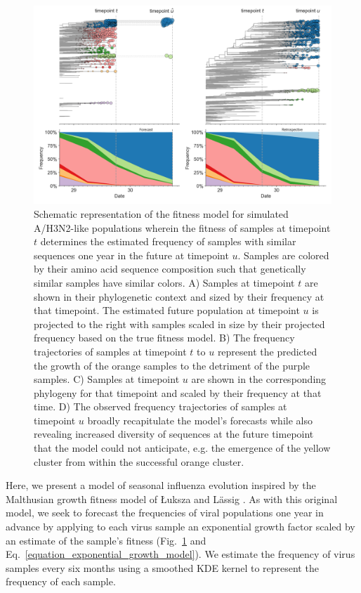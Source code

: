 \begin{figure}[ht]
  \begin{center}
  \includegraphics[width=\columnwidth]{figures/distance-based-fitness-model.png}
  \caption{
    Schematic representation of the fitness model for simulated A/H3N2-like populations wherein the fitness of samples at timepoint $t$ determines the estimated frequency of samples with similar sequences one year in the future at timepoint $u$.
    Samples are colored by their amino acid sequence composition such that genetically similar samples have similar colors.
    A) Samples at timepoint $t$ are shown in their phylogenetic context and sized by their frequency at that timepoint.
    The estimated future population at timepoint $u$ is projected to the right with samples scaled in size by their projected frequency based on the true fitness model.
    B) The frequency trajectories of samples at timepoint $t$ to $u$ represent the predicted the growth of the orange samples to the detriment of the purple samples.
    C) Samples at timepoint $u$ are shown in the corresponding phylogeny for that timepoint and scaled by their frequency at that time.
    D) The observed frequency trajectories of samples at timepoint $u$ broadly recapitulate the model's forecasts while also revealing increased diversity of sequences at the future timepoint that the model could not anticipate, e.g. the emergence of the yellow cluster from within the successful orange cluster.
  }
  \label{fig:model}
  \end{center}
\end{figure}

Here, we present a model of seasonal influenza evolution inspired by the Malthusian growth fitness model of {\L}uksza and L\"assig \cite{Luksza:2014hj}.
As with this original model, we seek to forecast the frequencies of viral populations one year in advance by applying to each virus sample an exponential growth factor scaled by an estimate of the sample's fitness (Fig.~\ref{fig:model} and Eq.~\ref{equation_exponential_growth_model}).
We estimate the frequency of virus samples every six months using a smoothed KDE kernel to represent the frequency of each sample.

